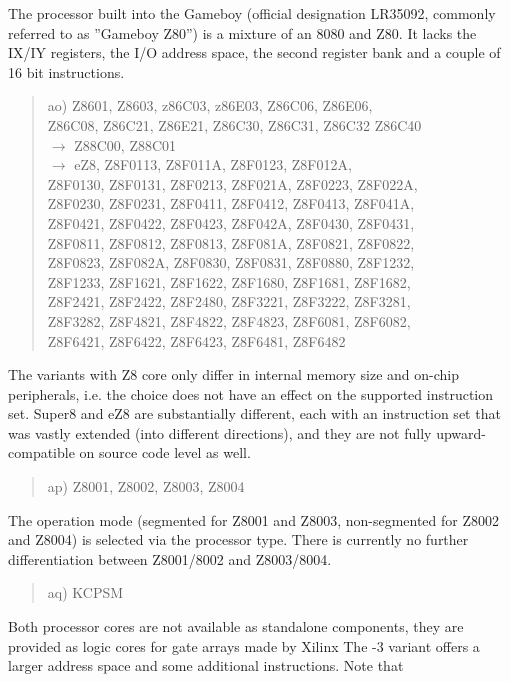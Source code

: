 \documentclass[12pt,twoside]{report}
\begin{document}
The processor built into the Gameboy (official designation LR35092,
commonly referred to as ''Gameboy Z80'') is a mixture of an 8080
and Z80.  It lacks the IX/IY registers, the I/O address space,
the second register bank and a couple of 16 bit instructions.
\begin{quote}
ao) Z8601, Z8603, z86C03, z86E03, Z86C06, Z86E06, \\
    Z86C08, Z86C21, Z86E21, Z86C30, Z86C31, Z86C32 Z86C40 \\
    $\rightarrow$ Z88C00, Z88C01 \\
    $\rightarrow$ eZ8, Z8F0113, Z8F011A, Z8F0123, Z8F012A, \\
    Z8F0130, Z8F0131, Z8F0213, Z8F021A, Z8F0223, Z8F022A, \\
    Z8F0230, Z8F0231, Z8F0411, Z8F0412, Z8F0413, Z8F041A, \\
    Z8F0421, Z8F0422, Z8F0423, Z8F042A, Z8F0430, Z8F0431, \\
    Z8F0811, Z8F0812, Z8F0813, Z8F081A, Z8F0821, Z8F0822, \\
    Z8F0823, Z8F082A, Z8F0830, Z8F0831, Z8F0880, Z8F1232, \\
    Z8F1233, Z8F1621, Z8F1622, Z8F1680, Z8F1681, Z8F1682, \\
    Z8F2421, Z8F2422, Z8F2480, Z8F3221, Z8F3222, Z8F3281, \\
    Z8F3282, Z8F4821, Z8F4822, Z8F4823, Z8F6081, Z8F6082, \\
    Z8F6421, Z8F6422, Z8F6423, Z8F6481, Z8F6482
\end{quote}
The variants with Z8 core only differ in internal memory size and
on-chip peripherals, i.e. the choice does not have an effect on the
supported instruction set.  Super8 and eZ8 are substantially different,
each with an instruction set that was vastly extended (into different
directions), and they are not fully upward-compatible on source code
level as well.
\begin{quote}
ap) Z8001, Z8002, Z8003, Z8004
\end{quote}
The operation mode (segmented for Z8001 and Z8003, non-segmented for
Z8002 and Z8004) is selected via the processor type.  There is currently
no further differentiation between Z8001/8002 and Z8003/8004.
\begin{quote}
aq) KCPSM
\end{quote}
Both processor cores are not available as standalone components, they are
provided as logic cores for gate arrays made by Xilinx The -3 variant
offers a larger address space and some additional instructions.  Note that
\end{document}
